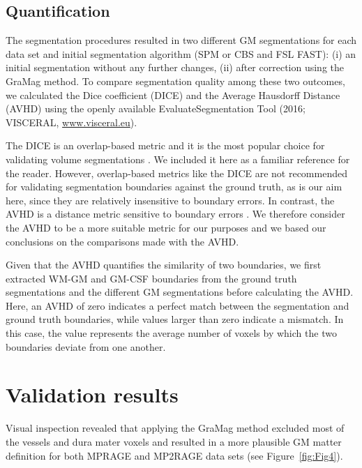 \subsection{Quantification}
The segmentation procedures resulted in two different GM segmentations for each data set and initial segmentation algorithm (SPM or CBS and FSL FAST): (i) an initial segmentation without any further changes, (ii) after correction using the GraMag method. To compare segmentation quality among these two outcomes, we calculated the Dice coefficient (DICE) and the Average Hausdorff Distance (AVHD) using the openly available EvaluateSegmentation Tool (2016; VISCERAL, \href{http://www.visceral.eu}{www.visceral.eu}).

The DICE is an overlap-based metric and it is the most popular choice for validating volume segmentations \parencite{Taha2015}. We included it here as a familiar reference for the reader. However, overlap-based metrics like the DICE are not recommended for validating segmentation boundaries against the ground truth, as is our aim here, since they are relatively insensitive to boundary errors. In contrast, the AVHD is a distance metric sensitive to boundary errors \parencite{Taha2015}. We therefore consider the AVHD to be a more suitable metric for our purposes and we based our conclusions on the comparisons made with the AVHD. 

Given that the AVHD quantifies the similarity of two boundaries, we first extracted WM-GM and GM-CSF boundaries from the ground truth segmentations and the different GM segmentations before calculating the AVHD. Here, an AVHD of zero indicates a perfect match between the segmentation and ground truth boundaries, while values larger than zero indicate a mismatch. In this case, the value represents the average number of voxels by which the two boundaries deviate from one another.

\section{Validation results}
\label{sec:ValidationResults}
Visual inspection revealed that applying the GraMag method excluded most of the vessels and dura mater voxels and resulted in a more plausible GM matter definition for both MPRAGE and MP2RAGE data sets (see Figure~\ref{fig:Fig4}).

